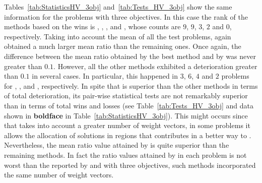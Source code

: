 Tables~\ref{tab:StatisticsHV_3obj} and~\ref{tab:Tests_HV_3obj} show the same information for the problems with three objectives.
%
In this case the rank of the methods based on the wins is \VSDMOEAD{}, \RMOEA{}, \MOEADDE{}, \NSGAIII{} and \NSGAII{}, whose counts are $9$, $9$, $3$, $2$ and $0$, respectively.
%
%
Taking into account the mean of all the test problems, \VSDMOEAD{} again obtained a much larger mean \HV{} ratio than the remaining ones.
%
Once again, the difference between the mean \HV{} ratio obtained by the best method and by \VSDMOEAD{} was never greater than $0.1$.
%
However, all the other methods exhibited a deterioration greater than $0.1$ in several cases.
%
In particular, this happened in $3$, $6$, $4$ and $2$ problems for \RMOEA{}, \NSGAII{}, \NSGAIII{} and \MOEADDE{}, respectively.
%
In spite that \VSDMOEAD{} is superior than the other methods in terms of total deterioration, its pair-wise statistical tests are not remarkably superior than \RMOEA{} in terms of total wins and losses (see Table~\ref{tab:Tests_HV_3obj} and data shown in {\bf boldface} in Table~\ref{tab:StatisticsHV_3obj}).
%
This might occurs since that \RMOEA{} takes into account a greater number of weight vectors, in some problems it allows the allocation of solutions in regions that contributes in a better way to \HV{}.
%
Nevertheless, the mean \HV{} ratio value attained by \VSDMOEAD{} is quite superior than the remaining methods.
%
In fact the \HV{} ratio values attained by \VSDMOEAD{} in each problem is not worst than the reported by \MOEADDE{} and \NSGAIII{} with three objectives, such methods incorporated the same number of weight vectors.
%
%










